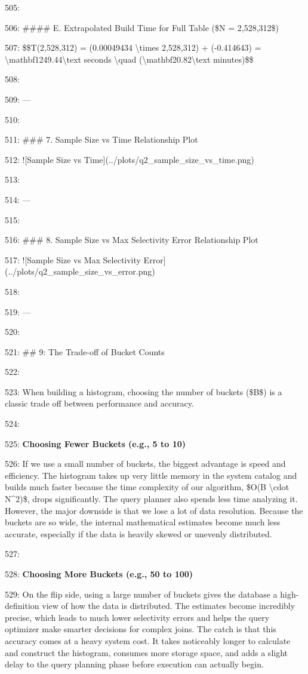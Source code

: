 \documentclass[11pt,a4paper]{article}
\begin{document}
505:

506: \#\#\#\# E. Extrapolated Build Time for Full Table (\$N = 2,528,312\$)

507: \$\$T(2,528,312) = (0.00049434 \textbackslash{}times 2,528,312) + (-0.414643) = \textbackslash{}mathbf{1249.44\textbackslash{}text{ seconds}} \textbackslash{}quad (\textbackslash{}mathbf{20.82\textbackslash{}text{ minutes}})\$\$

508:

509: ---

510:

511: \#\#\# 7. Sample Size vs Time Relationship Plot

512: ![Sample Size vs Time](../plots/q2\_sample\_size\_vs\_time.png)

513:

514: ---

515:

516: \#\#\# 8. Sample Size vs Max Selectivity Error Relationship Plot

517: ![Sample Size vs Max Selectivity Error](../plots/q2\_sample\_size\_vs\_error.png)

518:

519: ---

520:

521: \#\# 9: The Trade-off of Bucket Counts

522:

523: When building a histogram, choosing the number of buckets (\$B\$) is a classic trade off between performance and accuracy.

524:

525: \textbf{Choosing Fewer Buckets (e.g., 5 to 10)}

526: If we use a small number of buckets, the biggest advantage is speed and efficiency. The histogram takes up very little memory in the system catalog and builds much faster because the time complexity of our algorithm, \$O(B \textbackslash{}cdot N\textasciicircum{}2)\$, drops significantly. The query planner also spends less time analyzing it. However, the major downside is that we lose a lot of data resolution. Because the buckets are so wide, the internal mathematical estimates become much less accurate, especially if the data is heavily skewed or unevenly distributed.

527:

528: \textbf{Choosing More Buckets (e.g., 50 to 100)}

529: On the flip side, using a large number of buckets gives the database a high-definition view of how the data is distributed. The estimates become incredibly precise, which leads to much lower selectivity errors and helps the query optimizer make smarter decisions for complex joins. The catch is that this accuracy comes at a heavy system cost. It takes noticeably longer to calculate and construct the histogram, consumes more storage space, and adds a slight delay to the query planning phase before execution can actually begin.
\end{document}
